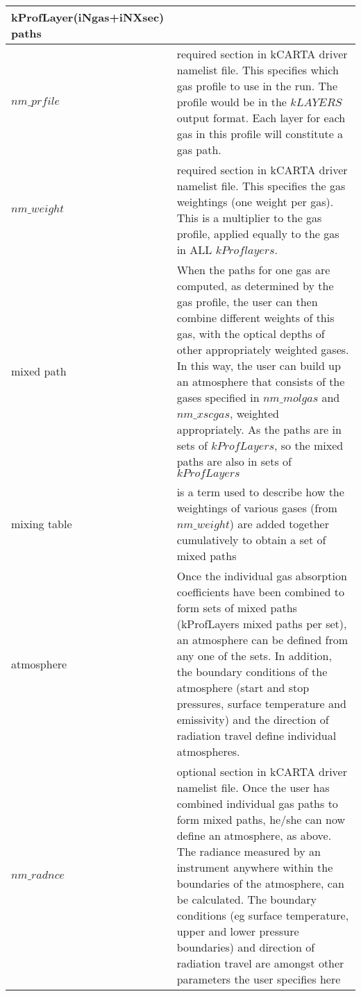 \documentclass[12pt]{article}
\newcommand{\kc}{\textsf{kCARTA}\xspace}
\newlength{\colwidth}
\begin{document}
\begin{longtable}{|l|p{\colwidth}|}
               kProfLayer(iNgas+iNXsec) paths\\ \hline
$nm\_prfile$ & required section in \kc driver namelist file.  This specifies 
              which gas  profile to use in the run. The profile would be in 
              the $kLAYERS$ output format. Each layer for each gas in this 
              profile will constitute a gas path.\\         \hline
$nm\_weight$ & required section in \kc driver namelist file.  This specifies 
               the gas weightings (one weight per gas).  This is a multiplier 
               to the gas profile, applied equally to the gas in ALL 
               $kProflayers$. \\ \hline
mixed path & When the paths for one gas are computed, as determined by the gas
             profile, the user can then combine different weights of this
             gas, with the optical depths of other appropriately weighted
             gases.  In this way, the user can build up an atmosphere that
             consists of the gases specified in $nm\_molgas$ and $nm\_xscgas$, 
             weighted appropriately. 
           As the paths are in sets of $kProfLayers$, so the mixed paths are 
           also in sets of $kProfLayers$\\ \hline
mixing table & is a term used to describe how the weightings of various
             gases (from $nm\_weight$) are added together cumulatively to
             obtain a set of mixed paths\\ \hline
atmosphere & Once the individual gas absorption coefficients have been
        combined to form sets of mixed paths (kProfLayers mixed paths per 
        set), an atmosphere can be defined from any one of the sets.
        In addition, the boundary conditions of the atmosphere (start
        and stop pressures, surface temperature and emissivity) and the
        direction of radiation travel define individual atmospheres.\\ \hline
$nm\_radnce$ & optional section in \kc driver namelist file.  Once the user 
               has combined individual gas paths to form mixed paths, he/she 
               can now define an atmosphere, as above. The radiance measured 
               by an instrument anywhere within the boundaries of the 
               atmosphere, can be calculated.  The boundary conditions (eg 
               surface temperature, upper and lower pressure boundaries) and 
               direction of radiation travel are amongst other parameters the 
               user specifies here\\ \hline

\end{longtable}
\end{document}
